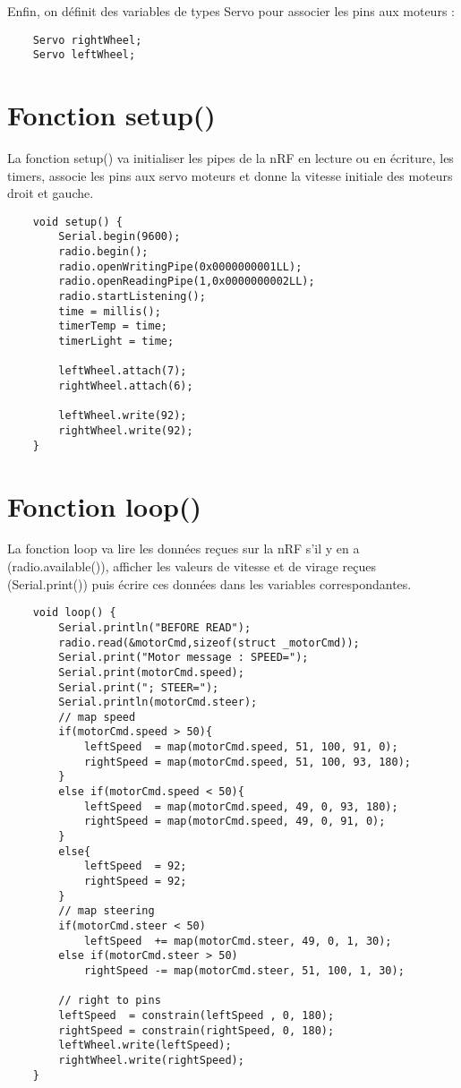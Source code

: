 Enfin, on définit des variables de types Servo pour associer les pins
aux moteurs :
\bigbreak
\begin{DDbox}{\linewidth}
\begin{lstlisting}
	Servo rightWheel;
	Servo leftWheel;
\end{lstlisting}
\end{DDbox}


\section{Fonction setup()}

La fonction setup() va initialiser les pipes de la nRF en lecture ou en écriture, 
les timers, associe les pins aux servo moteurs et donne la vitesse initiale des moteurs droit et gauche. 

\bigbreak
\begin{DDbox}{\linewidth}
\begin{lstlisting}
	void setup() {
		Serial.begin(9600);
		radio.begin();
		radio.openWritingPipe(0x0000000001LL);
		radio.openReadingPipe(1,0x0000000002LL);
		radio.startListening();
		time = millis();
		timerTemp = time;
		timerLight = time;
  
		leftWheel.attach(7);
		rightWheel.attach(6);

		leftWheel.write(92);
		rightWheel.write(92);
	}
\end{lstlisting}
\end{DDbox}



\section{Fonction loop()}

La fonction loop va lire les données reçues sur la nRF s'il y en a (radio.available()), afficher 
les valeurs de vitesse et de virage reçues (Serial.print()) puis écrire ces données dans les variables correspondantes.

\bigbreak
\begin{DDbox}{\linewidth}
\begin{lstlisting}
	void loop() {
		Serial.println("BEFORE READ");
		radio.read(&motorCmd,sizeof(struct _motorCmd));
		Serial.print("Motor message : SPEED=");
		Serial.print(motorCmd.speed);
		Serial.print("; STEER=");
		Serial.println(motorCmd.steer);
		// map speed
		if(motorCmd.speed > 50){
			leftSpeed  = map(motorCmd.speed, 51, 100, 91, 0);
			rightSpeed = map(motorCmd.speed, 51, 100, 93, 180);
		}
		else if(motorCmd.speed < 50){
			leftSpeed  = map(motorCmd.speed, 49, 0, 93, 180);
			rightSpeed = map(motorCmd.speed, 49, 0, 91, 0);
		}
		else{
			leftSpeed  = 92;
			rightSpeed = 92;
		}
		// map steering
		if(motorCmd.steer < 50)
			leftSpeed  += map(motorCmd.steer, 49, 0, 1, 30);
		else if(motorCmd.steer > 50)
			rightSpeed -= map(motorCmd.steer, 51, 100, 1, 30);
    
		// right to pins
		leftSpeed  = constrain(leftSpeed , 0, 180);
		rightSpeed = constrain(rightSpeed, 0, 180);
		leftWheel.write(leftSpeed);
		rightWheel.write(rightSpeed);
	}

\end{lstlisting}
\end{DDbox}

